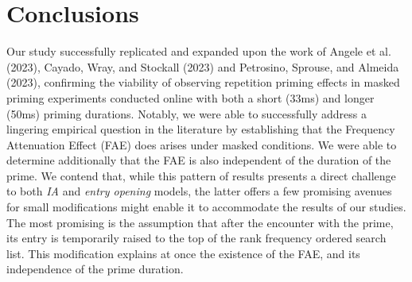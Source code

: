 \documentclass[
]{interact}
\begin{document}
\section{Conclusions}\label{conclusions}

Our study successfully replicated and expanded upon the work of Angele
et al. (2023), Cayado, Wray, and Stockall (2023) and Petrosino, Sprouse,
and Almeida (2023), confirming the viability of observing repetition
priming effects in masked priming experiments conducted online with both
a short (33ms) and longer (50ms) priming durations. Notably, we were
able to successfully address a lingering empirical question in the
literature by establishing that the Frequency Attenuation Effect (FAE)
does arises under masked conditions. We were able to determine
additionally that the FAE is also independent of the duration of the
prime. We contend that, while this pattern of results presents a direct
challenge to both \emph{IA} and \emph{entry opening} models, the latter
offers a few promising avenues for small modifications might enable it
to accommodate the results of our studies. The most promising is the
assumption that after the encounter with the prime, its entry is
temporarily raised to the top of the rank frequency ordered search list.
This modification explains at once the existence of the FAE, and its
independence of the prime duration.
\end{document}
